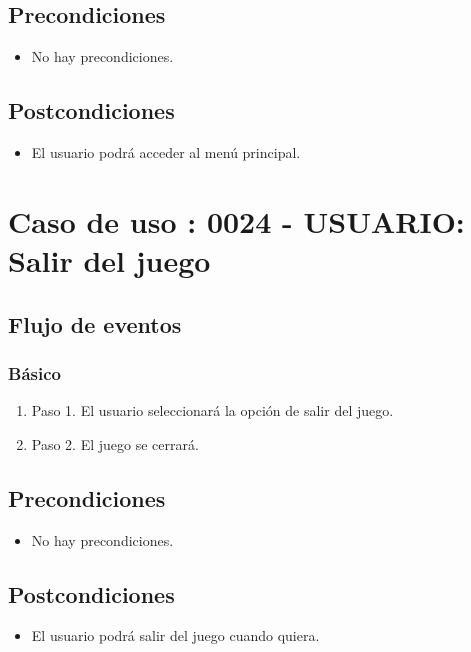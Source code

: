 \subsection{Precondiciones}
\begin{itemize}
\item No hay precondiciones.
\end{itemize}

\subsection{Postcondiciones}
\begin{itemize}
\item El usuario podrá acceder al menú principal.
\end{itemize}



\section{Caso de uso : 0024 - USUARIO: Salir del juego}\label{sec:uc0}
\subsection{Flujo de eventos}
\subsubsection{Básico}

\begin{enumerate}
\item Paso 1.
El usuario seleccionará la opción de salir del juego. 
\item Paso 2.
El juego se cerrará.
\end{enumerate}

\subsection{Precondiciones}
\begin{itemize}
\item No hay precondiciones.
\end{itemize}

\subsection{Postcondiciones}
\begin{itemize}
\item El usuario podrá salir del juego cuando quiera. 
\end{itemize}



